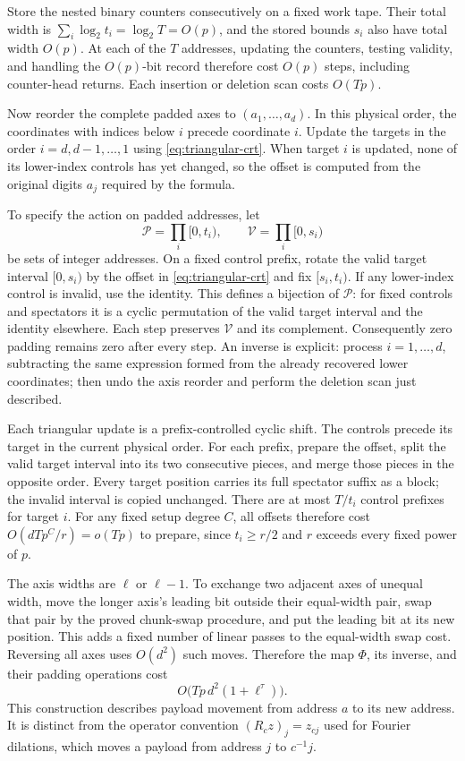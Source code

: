 \documentclass[11pt]{article}
\theoremstyle{definition}
\begin{document}
Store the nested binary counters consecutively on a fixed work tape.
Their total width is $\sum_i\log_2t_i=\log_2T=O(p)$, and the stored
bounds $s_i$ also have total width $O(p)$.  At each of the $T$
addresses, updating the counters, testing validity, and handling the
$O(p)$-bit record therefore cost $O(p)$ steps, including counter-head
returns.  Each insertion or deletion scan costs $O(Tp)$.

Now reorder the complete padded axes to $(a_1,\ldots,a_d)$.  In this
physical order, the coordinates with
indices below $i$ precede coordinate $i$.  Update the targets in the
order $i=d,d-1,\ldots,1$ using \eqref{eq:triangular-crt}.  When target
$i$ is updated, none of its lower-index controls has yet changed, so
the offset is computed from the original digits $a_j$ required by the
formula.

To specify the action on padded addresses, let
\[
 \mathcal P=\prod_i[0,t_i),\qquad \mathcal V=\prod_i[0,s_i)
\]
be sets of integer addresses.  On a fixed control prefix, rotate the
valid target interval $[0,s_i)$ by the offset in
\eqref{eq:triangular-crt} and fix $[s_i,t_i)$.  If any lower-index
control is invalid, use the identity.  This defines a bijection of
$\mathcal P$: for fixed controls and spectators it is a cyclic
permutation of the valid target interval and the identity elsewhere.
Each step preserves $\mathcal V$ and its complement.  Consequently
zero padding remains zero after every step.  An inverse is explicit:
process $i=1,\ldots,d$, subtracting the same expression formed from the
already recovered lower coordinates; then undo the axis reorder and
perform the deletion scan just described.

Each triangular update is a prefix-controlled cyclic shift.  The
controls precede its target in the current physical order.  For each
prefix, prepare the offset, split the valid target interval into its
two consecutive pieces, and merge those pieces in the opposite order.
Every target position carries its full spectator suffix as a block;
the invalid interval is copied unchanged.  There are at most $T/t_i$
control prefixes for target $i$.  For any fixed setup degree $C$, all
offsets therefore cost $O(dTp^C/r)=o(Tp)$ to prepare, since
$t_i\ge r/2$ and $r$ exceeds every fixed power of $p$.

The axis widths are $\ell$ or $\ell-1$.  To exchange two adjacent axes
of unequal width, move the longer axis's leading bit outside their
equal-width pair, swap that pair by the proved chunk-swap procedure,
and put the leading bit at its new position.  This adds a fixed number
of linear passes to the equal-width swap cost.  Reversing all axes
uses $O(d^2)$ such moves.  Therefore the map $\Phi$, its inverse, and
their padding operations cost
\[
 O\bigl(Tp\,d^2(1+\ell^\tau)\bigr).
\]
This construction describes payload movement from address $a$ to its
new address.  It is distinct from the operator convention
$(R_cz)_j=z_{cj}$ used for Fourier dilations, which moves a payload
from address $j$ to $c^{-1}j$.
\end{document}
